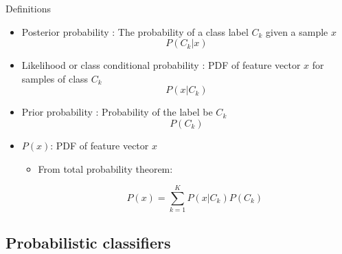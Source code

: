 \documentclass[serif, aspectratio=169]{beamer}
\begin{document}
\begin{frame}{Definitions}
    \begin{itemize}
        \item Posterior probability : The probability of a class label $C_k$ given a sample $x$
            \[
                P(C_k|x)
            \]
            
        \item Likelihood or class conditional probability : PDF of feature vector $x$ for samples of class $C_k$
            \[
                 P(x|C_k)
            \]
        
        \item Prior probability : Probability of the label be $C_k$ 
            \[
            P(C_k)
            \]
            
        \item $P(x)$: PDF of feature vector $x$ 
            \begin{itemize}
                \item From total probability theorem:   
                
                \[ P(x)=\sum_{k=1}^{K}P(x|C_k)P(C_k)
                \]
            \end{itemize}
        
    \end{itemize}
\end{frame}



\subsection{Probabilistic classifiers}
\end{document}
